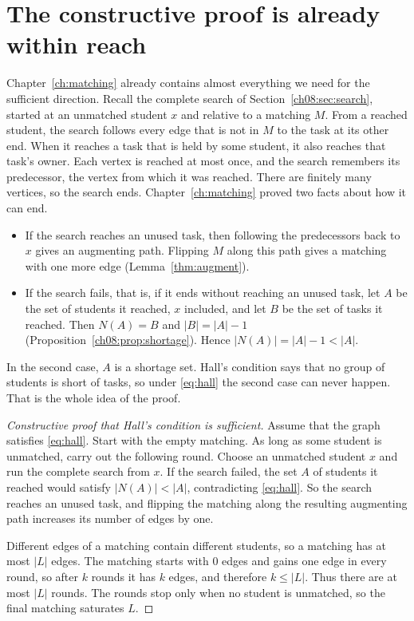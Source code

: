 \section{The constructive proof is already within reach}\label{ch09:sec:constructive}
Chapter~\ref{ch:matching} already contains almost everything we need for the sufficient direction. Recall the complete search of Section~\ref{ch08:sec:search}, started at an unmatched student $x$ and relative to a matching $M$. From a reached student, the search follows every edge that is not in $M$ to the task at its other end. When it reaches a task that is held by some student, it also reaches that task's owner. Each vertex is reached at most once, and the search remembers its predecessor, the vertex from which it was reached. There are finitely many vertices, so the search ends. Chapter~\ref{ch:matching} proved two facts about how it can end.
\begin{itemize}
\item If the search reaches an unused task, then following the predecessors back to $x$ gives an augmenting path. Flipping $M$ along this path gives a matching with one more edge (Lemma~\ref{thm:augment}).
\item If the search fails, that is, if it ends without reaching an unused task, let $A$ be the set of students it reached, $x$ included, and let $B$ be the set of tasks it reached. Then $N(A)=B$ and $|B|=|A|-1$ (Proposition~\ref{ch08:prop:shortage}). Hence $|N(A)|=|A|-1<|A|$.
\end{itemize}
In the second case, $A$ is a shortage set. Hall's condition says that no group of students is short of tasks, so under \eqref{eq:hall} the second case can never happen. That is the whole idea of the proof.

\begin{proof}[Constructive proof that Hall's condition is sufficient]
Assume that the graph satisfies \eqref{eq:hall}. Start with the empty matching. As long as some student is unmatched, carry out the following round. Choose an unmatched student $x$ and run the complete search from $x$. If the search failed, the set $A$ of students it reached would satisfy $|N(A)|<|A|$, contradicting \eqref{eq:hall}. So the search reaches an unused task, and flipping the matching along the resulting augmenting path increases its number of edges by one.

Different edges of a matching contain different students, so a matching has at most $|L|$ edges. The matching starts with $0$ edges and gains one edge in every round, so after $k$ rounds it has $k$ edges, and therefore $k\le|L|$. Thus there are at most $|L|$ rounds. The rounds stop only when no student is unmatched, so the final matching saturates $L$.
\end{proof}

